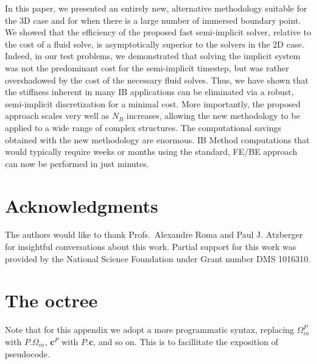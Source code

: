 \documentclass[preprint,12pt]{elsarticle}
\newcommand{\B}[1]{\mathbf{#1}}
\newcommand{\Panel}[1]{#1}
\begin{document}
In this paper, we presented an entirely new, alternative methodology suitable for the 3D case and for when there is a large number of immersed boundary point. We showed that the efficiency of the proposed  fast  semi-implicit solver,  relative to the cost of a fluid solve,  is asymptotically superior to the solvers in the 2D case. Indeed, in our test problems, we demonstrated that solving the implicit system was not the predominant cost for the semi-implicit timestep, but was rather overshadowed by the cost of the necessary fluid solves. Thus, we have  shown that the stiffness inherent in many IB applications can be eliminated via a  robust, semi-implicit discretization  for a minimal cost. More importantly, the proposed approach scales very well as $N_B$ increases, allowing the new methodology to be applied to a wide range of complex structures.
The computational savings obtained with the new methodology are enormous. IB Method computations that would typically require weeks or months using the  standard, FE/BE approach can now be performed in just minutes. 

\section*{Acknowledgments}
The authors would like to thank Profs.~Alexandre Roma and Paul J. Atzberger for insightful conversations about this work.  
Partial support for this work was provided by the National Science Foundation under Grant number DMS 1016310. 


\appendix
\section{The octree}
\label{App:octree}
Note that for this appendix we adopt a more programmatic syntax, replacing $\Omega_{in}^P$ with $\Panel{P}.\Omega_{in}$, $\B{c}^P$ with $\Panel{P}.\B{c}$, and so on. This is to facillitate the exposition of pseudocode.
\end{document}
